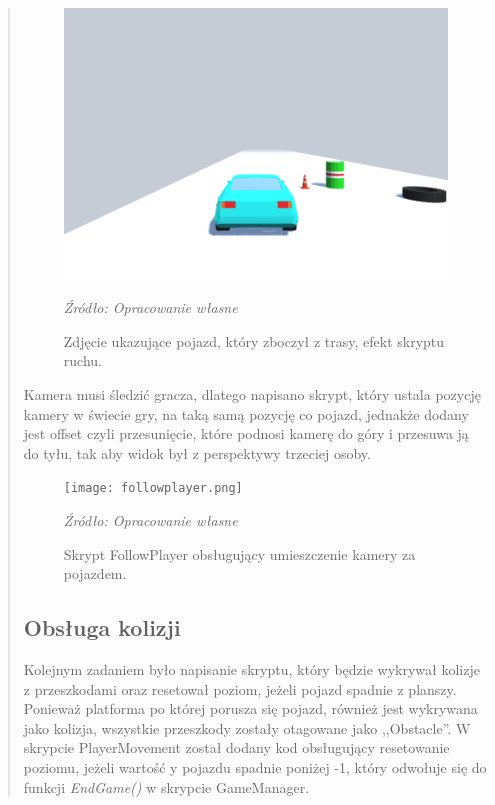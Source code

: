 \begin{quotation}
\begin{figure}[!h]
\centering
  \includegraphics[width=1\linewidth]{carmove.png}
  \caption{Zdjęcie ukazujące pojazd, który zboczył z trasy, efekt skryptu ruchu.}\label{rys_22}
  \begin{minipage}[t]{0.75\linewidth}
    \emph{Źródło: Opracowanie własne}
  \end{minipage}
\end{figure}

\indent Kamera musi śledzić gracza, dlatego napisano skrypt, który ustala pozycję kamery w świecie gry, na taką samą pozycję co pojazd, jednakże dodany jest offset czyli przesunięcie, które podnosi kamerę do góry i przesuwa ją do tyłu, tak aby widok był z perspektywy trzeciej osoby.

\begin{figure}[!h]
\centering
  \texttt{[image: followplayer.png]}
  \caption{Skrypt FollowPlayer obsługujący umieszczenie kamery za pojazdem.}\label{rys_23}
  \begin{minipage}[t]{0.75\linewidth}
    \emph{Źródło: Opracowanie własne}
  \end{minipage}
\end{figure}
\newpage
\subsection{Obsługa kolizji}
\indent Kolejnym zadaniem było napisanie skryptu, który będzie wykrywał kolizje z przeszkodami oraz resetował poziom, jeżeli pojazd spadnie z planszy. Ponieważ platforma po której porusza się pojazd, również jest wykrywana jako kolizja, wszystkie przeszkody zostały otagowane jako ,,Obstacle''. W skrypcie PlayerMovement został dodany kod obsługujący resetowanie poziomu, jeżeli wartość y pojazdu spadnie poniżej -1, który odwołuje się do funkcji \textit{EndGame()} w skrypcie GameManager.


\end{quotation}
